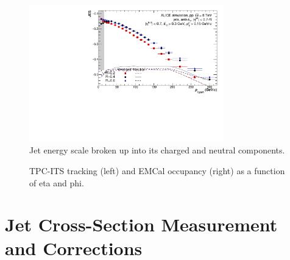 \documentclass[ALICE]{ALICE_analysis_notes}
\begin{document}
\begin{figure}[h!]
    \centering
    \includegraphics[width=0.75\textwidth]{figures/EnergyScale/ROrdering/JES_8_3_ChNe.pdf}
    \caption{Jet energy scale broken up into its charged and neutral components.}
    \label{fig:eScaleChNe}
\end{figure}

\begin{figure}[h!]
    \centering
    \caption{TPC-ITS tracking (left) and EMCal occupancy (right) as a function of eta and phi.}
    \label{fig:eScaleTracksClusters}
\end{figure}
\clearpage{}
\clearpage{}\section{Jet Cross-Section Measurement and Corrections}
\label{chap:jetXsec}
\end{document}

